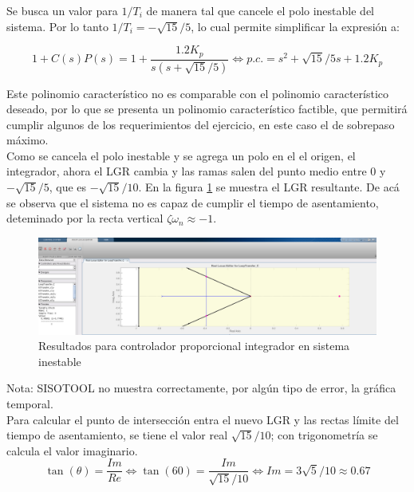 \documentclass{report}
\begin{document}
Se busca un valor para \(1/T_i\) de manera tal que cancele el polo inestable del sistema. Por lo tanto \(1/T_i=-\sqrt{15}/5\), lo cual permite simplificar la expresión a:

\begin{equation*}
    1+C(s)P(s) =  1 + \frac{1.2K_p}{s(s+\sqrt{15}/5)} \Leftrightarrow p.c. = s^2+\sqrt{15}/5s+1.2K_p
    \label{Eq:14}
\end{equation*}

Este polinomio característico no es comparable con el polinomio característico deseado, por lo que se presenta un polinomio característico factible, que permitirá cumplir algunos de los
requerimientos del ejercicio, en este caso el de sobrepaso máximo.\\

Como se cancela el polo inestable y se agrega un polo en el el origen, el integrador, ahora el LGR cambia y las ramas salen del punto medio entre 0 y \(-\sqrt{15}/5\), que es \(-\sqrt{15}/10\). 
En la figura \ref{F:P2_PI} se muestra el LGR resultante. De acá se observa que el sistema no es capaz de cumplir el tiempo de asentamiento, deteminado por la recta vertical \(\zeta \omega_n \approx -1\).

\begin{figure}[h!]
    \centering  
    \includegraphics[width=1\textwidth]{P2_PI.png}
    \caption{Resultados para controlador proporcional integrador en sistema inestable}
    \label{F:P2_PI}
\end{figure}

Nota: SISOTOOL no muestra correctamente, por algún tipo de error, la gráfica temporal.\\

Para calcular el punto de intersección entra el nuevo LGR y las rectas límite del tiempo de asentamiento, se tiene el valor real \(\sqrt{15}/10\); con trigonometría se calcula el valor imaginario.\\


\begin{equation*}
    \tan(\theta) = \frac{Im}{Re} \Leftrightarrow \tan(60) = \frac{Im}{\sqrt{15}/10} \Leftrightarrow Im = 3\sqrt{5}/10 \approx 0.67
    \label{Eq:15}
\end{equation*}
\end{document}

